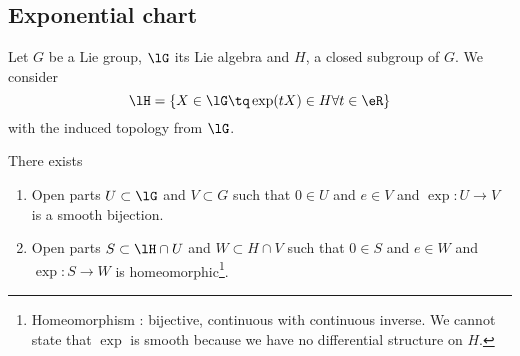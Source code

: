 \subsection{Exponential chart}


\begin{lemma}     \label{LEMooNPLBooBrwNWY}
	Let \( G\) be a Lie group, \( \lG\) its Lie algebra and \( H\), a closed subgroup of \( G\). We consider
	\begin{equation}
		\lH=\{ X\in \lG\tq \exp(tX)\in H\forall t\in \eR \}
	\end{equation}
	with the induced topology from \( \lG\).

	There exists
	\begin{enumerate}
		\item
		      Open parts \( U\subset \lG\) and \( V\subset G\) such that \( 0\in U\) and \( e\in V\) and \(\exp \colon U\to V  \) is a smooth bijection.
		\item
		      Open parts \( S\subset\lH\cap U\) and \( W\subset H\cap V\) such that \( 0\in S\) and \( e\in W\) and \(\exp \colon S\to W  \) is homeomorphic\footnote{Homeomorphism : bijective, continuous with continuous inverse. We cannot state that \( \exp\) is smooth because we have no differential structure on \( H\).}.
	\end{enumerate}
\end{lemma}

